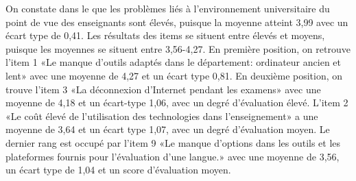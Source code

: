 \documentclass[french]{textolivre}
\begin{document}
On constate dans le  que les problèmes liés à l'environnement universitaire du point de vue des enseignants sont élevés, puisque la moyenne atteint 3,99 avec un écart type de 0,41. Les résultats des items se situent entre élevés et moyens, puisque les moyennes se situent entre 3,56-4,27. En première position, on retrouve l’item 1 «Le manque d'outils adaptés dans le département: ordinateur ancien et lent» avec une moyenne de 4,27 et un écart type 0,81. En deuxième position, on trouve l’item 3 «La déconnexion d'Internet pendant les examens» avec une moyenne de 4,18 et un écart-type 1,06, avec un degré d'évaluation élevé. L’item 2 «Le coût élevé de l'utilisation des technologies dans l'enseignement» a une moyenne de 3,64 et un écart type 1,07, avec un degré d'évaluation moyen. Le dernier rang est occupé par l’item 9 «Le manque d'options dans les outils et les plateformes fournis pour l'évaluation d'une langue.» avec une moyenne de 3,56, un écart type de 1,04 et un score d'évaluation moyen.
\end{document}
